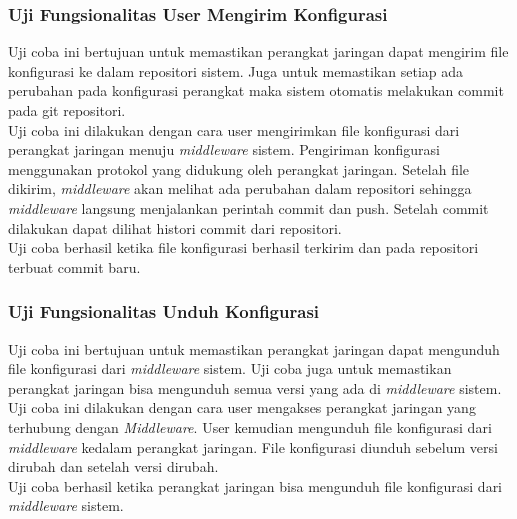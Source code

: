    		\subsubsection{Uji Fungsionalitas User Mengirim Konfigurasi}
    	Uji coba ini bertujuan untuk memastikan perangkat jaringan dapat mengirim file konfigurasi ke dalam repositori sistem. Juga untuk memastikan setiap ada perubahan pada konfigurasi perangkat maka sistem otomatis melakukan commit pada git repositori.\\
    	\indent Uji coba ini dilakukan dengan cara user mengirimkan file konfigurasi dari perangkat jaringan menuju \textit{middleware} sistem. Pengiriman konfigurasi menggunakan protokol yang didukung oleh perangkat jaringan. Setelah file dikirim, \textit{middleware} akan melihat ada perubahan dalam repositori sehingga \textit{middleware} langsung menjalankan perintah commit dan push. Setelah commit dilakukan dapat dilihat histori commit dari repositori.\\
    	\indent Uji coba berhasil ketika file konfigurasi berhasil terkirim dan pada repositori terbuat commit baru.
    	
    	\subsubsection{Uji Fungsionalitas Unduh Konfigurasi}
    	Uji coba ini bertujuan untuk memastikan perangkat jaringan dapat mengunduh file konfigurasi dari \textit{middleware} sistem. Uji coba juga untuk memastikan perangkat jaringan bisa mengunduh semua versi yang ada di \textit{middleware} sistem. \\
    	\indent Uji coba ini dilakukan dengan cara user mengakses perangkat jaringan yang terhubung dengan \textit{Middleware}. User kemudian mengunduh file konfigurasi dari \textit{middleware} kedalam perangkat jaringan. File konfigurasi diunduh sebelum versi dirubah dan setelah versi dirubah. \\
    	\indent Uji coba berhasil ketika perangkat jaringan bisa mengunduh file konfigurasi dari \textit{middleware} sistem.
    	
